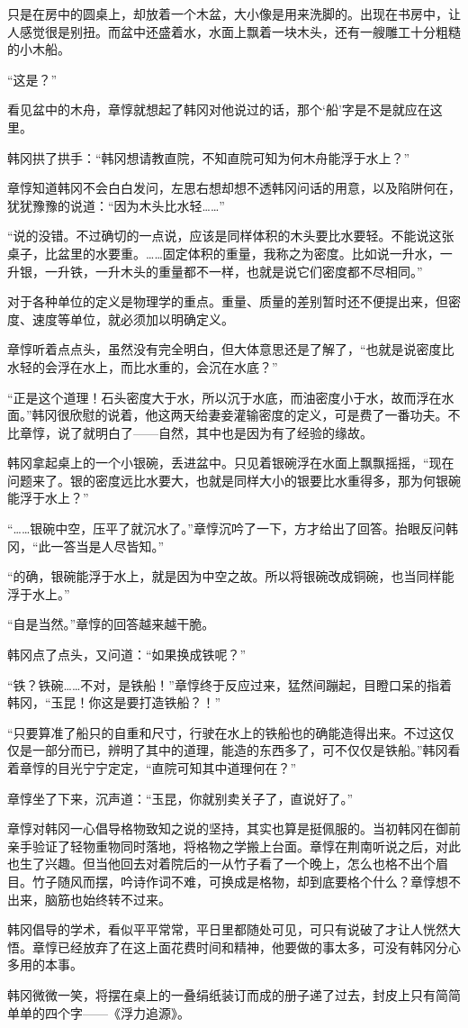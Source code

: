 只是在房中的圆桌上，却放着一个木盆，大小像是用来洗脚的。出现在书房中，让人感觉很是别扭。而盆中还盛着水，水面上飘着一块木头，还有一艘雕工十分粗糙的小木船。

“这是？”

看见盆中的木舟，章惇就想起了韩冈对他说过的话，那个‘船’字是不是就应在这里。

韩冈拱了拱手：“韩冈想请教直院，不知直院可知为何木舟能浮于水上？”

章惇知道韩冈不会白白发问，左思右想却想不透韩冈问话的用意，以及陷阱何在，犹犹豫豫的说道：“因为木头比水轻……”

“说的没错。不过确切的一点说，应该是同样体积的木头要比水要轻。不能说这张桌子，比盆里的水要重。……固定体积的重量，我称之为密度。比如说一升水，一升银，一升铁，一升木头的重量都不一样，也就是说它们密度都不尽相同。”

对于各种单位的定义是物理学的重点。重量、质量的差别暂时还不便提出来，但密度、速度等单位，就必须加以明确定义。

章惇听着点点头，虽然没有完全明白，但大体意思还是了解了，“也就是说密度比水轻的会浮在水上，而比水重的，会沉在水底？”

“正是这个道理！石头密度大于水，所以沉于水底，而油密度小于水，故而浮在水面。”韩冈很欣慰的说着，他这两天给妻妾灌输密度的定义，可是费了一番功夫。不比章惇，说了就明白了——自然，其中也是因为有了经验的缘故。

韩冈拿起桌上的一个小银碗，丢进盆中。只见着银碗浮在水面上飘飘摇摇，“现在问题来了。银的密度远比水要大，也就是同样大小的银要比水重得多，那为何银碗能浮于水上？”

“……银碗中空，压平了就沉水了。”章惇沉吟了一下，方才给出了回答。抬眼反问韩冈，“此一答当是人尽皆知。”

“的确，银碗能浮于水上，就是因为中空之故。所以将银碗改成铜碗，也当同样能浮于水上。”

“自是当然。”章惇的回答越来越干脆。

韩冈点了点头，又问道：“如果换成铁呢？”

“铁？铁碗……不对，是铁船！”章惇终于反应过来，猛然间蹦起，目瞪口呆的指着韩冈，“玉昆！你这是要打造铁船？！”

“只要算准了船只的自重和尺寸，行驶在水上的铁船也的确能造得出来。不过这仅仅是一部分而已，辨明了其中的道理，能造的东西多了，可不仅仅是铁船。”韩冈看着章惇的目光宁宁定定，“直院可知其中道理何在？”

章惇坐了下来，沉声道：“玉昆，你就别卖关子了，直说好了。”

章惇对韩冈一心倡导格物致知之说的坚持，其实也算是挺佩服的。当初韩冈在御前亲手验证了轻物重物同时落地，将格物之学搬上台面。章惇在荆南听说之后，对此也生了兴趣。但当他回去对着院后的一从竹子看了一个晚上，怎么也格不出个眉目。竹子随风而摆，吟诗作词不难，可换成是格物，却到底要格个什么？章惇想不出来，脑筋也始终转不过来。

韩冈倡导的学术，看似平平常常，平日里都随处可见，可只有说破了才让人恍然大悟。章惇已经放弃了在这上面花费时间和精神，他要做的事太多，可没有韩冈分心多用的本事。

韩冈微微一笑，将摆在桌上的一叠绢纸装订而成的册子递了过去，封皮上只有简简单单的四个字——《浮力追源》。

